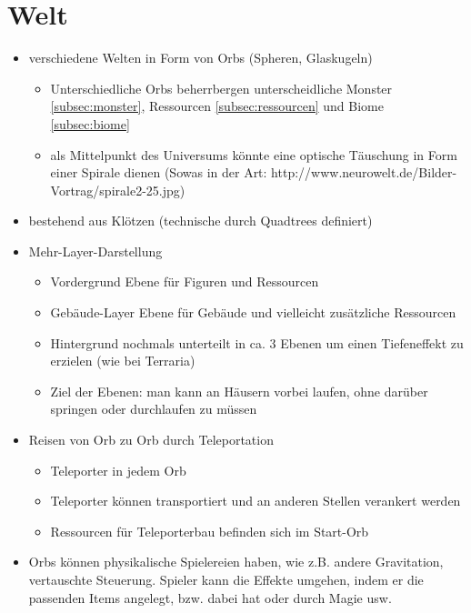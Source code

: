 \section{Welt}
\label{sec:welt}
	\begin{itemize}
		\item verschiedene Welten in Form von Orbs (Spheren, Glaskugeln)
		\begin{itemize}
			\item Unterschiedliche Orbs beherrbergen unterscheidliche Monster \ref{subsec:monster}, Ressourcen \ref{subsec:ressourcen} und Biome \ref{subsec:biome}
			\item als Mittelpunkt des Universums könnte eine optische Täuschung in Form einer Spirale dienen (Sowas in der Art: http://www.neurowelt.de/Bilder-Vortrag/spirale2-25.jpg)
		\end{itemize}
		\item bestehend aus Klötzen (technische durch Quadtrees definiert)
		\item Mehr-Layer-Darstellung
		\begin{itemize}
			\item Vordergrund
				\subitem Ebene für Figuren und Ressourcen
			\item Gebäude-Layer
				\subitem Ebene für Gebäude und vielleicht zusätzliche Ressourcen
			\item Hintergrund
				\subitem nochmals unterteilt in ca. 3 Ebenen um einen Tiefeneffekt zu erzielen (wie bei Terraria)
			\item Ziel der Ebenen: man kann an Häusern vorbei laufen, ohne darüber springen oder durchlaufen zu müssen
		\end{itemize}
		\item Reisen von Orb zu Orb durch Teleportation
		\begin{itemize}
			\item Teleporter in jedem Orb
			\item Teleporter können transportiert und an anderen Stellen verankert werden
			\item Ressourcen für Teleporterbau befinden sich im Start-Orb
		\end{itemize}
		\item Orbs können physikalische Spielereien haben, wie z.B. andere Gravitation, vertauschte Steuerung. Spieler kann die Effekte umgehen, indem er die passenden Items angelegt, bzw. dabei hat oder durch Magie usw.
	\end{itemize}

